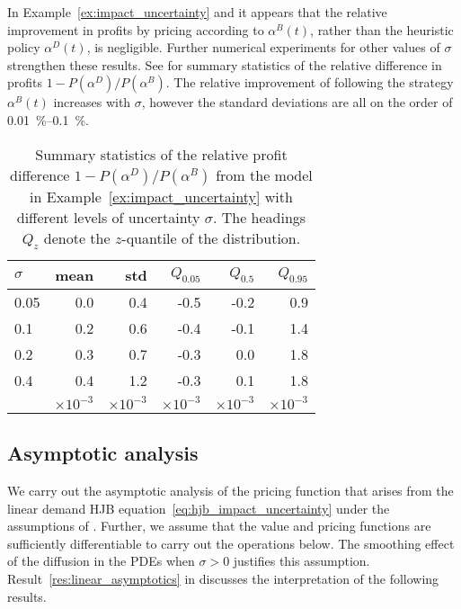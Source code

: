 \documentclass[main.tex]{subfiles}
\begin{document}
In Example~\ref{ex:impact_uncertainty} and
 it appears that the relative
improvement in profits by pricing according to $\alpha^B(t)$, rather than the heuristic
policy $\alpha^D(t)$, is negligible.
Further numerical experiments for other values of $\sigma$ strengthen
these results. See  for summary
statistics of the relative difference in profits
$1-P(\alpha^D)/P(\alpha^B)$.
The relative improvement of following the strategy $\alpha^B(t)$
increases with $\sigma$, however the standard deviations are all on
the order of \SIrange{0.01}{0.1}{\percent}.
\begin{table}[htb]
  \centering
  \begin{tabular}{lrrrrr}
    \toprule
    $\sigma$ & mean & std & $Q_{0.05}$ & $Q_{0.5}$ & $Q_{0.95}$\\
    \midrule
    0.05& 0.0 & 0.4 &-0.5&-0.2&0.9\\
    0.1&0.2& 0.6&-0.4&-0.1&1.4\\
    0.2&0.3& 0.7&-0.3&0.0&1.8\\
    0.4&0.4& 1.2&-0.3&0.1&1.8\\
    \midrule
             & $\times 10^{-3}$&$\times 10^{-3}$&$\times 10^{-3}$&$\times 10^{-3}$&$\times 10^{-3}$\\
    \bottomrule
  \end{tabular}
  \caption{Summary statistics of the relative profit difference
    $1-P(\alpha^D)/P(\alpha^B)$ from the model in
    Example~\ref{ex:impact_uncertainty} with different levels of
    uncertainty $\sigma$.
    The headings $Q_z$ denote the $z$-quantile of the distribution.
  }\label{tbl:profit_hjb_cec_statistics}
\end{table}

\subsection{Asymptotic analysis}\label{subsec:asymptotic_analysis}
We carry out the asymptotic analysis of the pricing function
that arises from the linear demand HJB
equation~\eqref{eq:hjb_impact_uncertainty} under the assumptions of
.
Further, we assume that the value and pricing functions are sufficiently
differentiable to carry out the operations below. The smoothing effect
of the diffusion in the PDEs when $\sigma>0$ justifies this assumption.
Result~\ref{res:linear_asymptotics} in 
discusses the interpretation of the following results.
\end{document}

